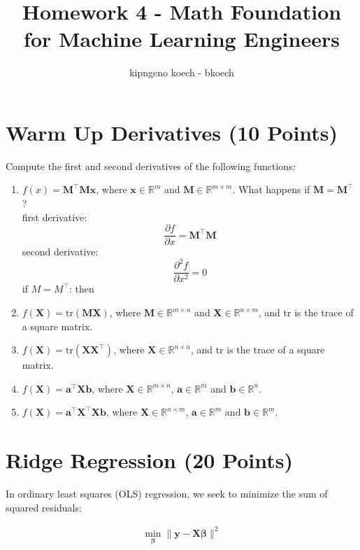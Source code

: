 \documentclass{article}
\begin{document}
\author{kipngeno koech - bkoech}
\title{Homework 4 - Math Foundation for Machine Learning Engineers}   
\maketitle

\medskip


\section{Warm Up Derivatives (10 Points)}
Compute the first and second derivatives of the following functions:
\begin{enumerate}
    \item $f(x) = \mathbf{M}^\top \mathbf{M} \mathbf{x}$, where $\mathbf{x} \in \mathbb{R}^m$ and $\mathbf{M} \in \mathbb{R}^{m \times m}$. What happens if $\mathbf{M} = \mathbf{M}^\top$?
    \\ first derivative:
    \[
    \frac{\partial f}{\partial x} = \mathbf{M}^\top \mathbf{M}
    \]
    second derivative:
    \[
    \frac{\partial^2 f}{\partial x^2} = 0
    \]
    if $M = M^\top$: then 
    \item $f(\mathbf{X}) = \text{tr}(\mathbf{M}\mathbf{X})$, where $\mathbf{M} \in \mathbb{R}^{m \times n}$ and $\mathbf{X} \in \mathbb{R}^{n \times m}$, and $\text{tr}$ is the trace of a square matrix.
    \item $f(\mathbf{X}) = \text{tr}(\mathbf{X} \mathbf{X}^\top)$, where $\mathbf{X} \in \mathbb{R}^{n \times n}$, and $\text{tr}$ is the trace of a square matrix.
    \item $f(\mathbf{X}) = \mathbf{a}^\top \mathbf{X} \mathbf{b}$, where $\mathbf{X} \in \mathbb{R}^{m \times n}$, $\mathbf{a} \in \mathbb{R}^m$ and $\mathbf{b} \in \mathbb{R}^n$.
    \item $f(\mathbf{X}) = \mathbf{a}^\top \mathbf{X}^\top \mathbf{X} \mathbf{b}$, where $\mathbf{X} \in \mathbb{R}^{n \times m}$, $\mathbf{a} \in \mathbb{R}^m$ and $\mathbf{b} \in \mathbb{R}^m$.
\end{enumerate}

\section{Ridge Regression (20 Points)}
In ordinary least squares (OLS) regression, we seek to minimize the sum of squared residuals:

\begin{align}
\min_{\boldsymbol{\beta}} \|\mathbf{y} - \mathbf{X} \boldsymbol{\beta} \|^2
\end{align}
\end{document}
